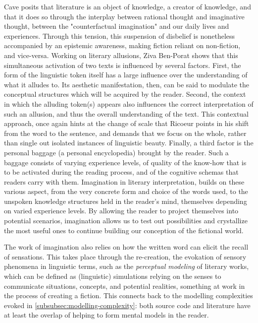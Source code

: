 Cave posits that literature is an object of knowledge, a creator of knowledge, and that it does so through the interplay between rational thought and imaginative thought, between the "counterfactual imagination" and our daily lives and experiences. Through this tension, this suspension of disbelief is nonetheless accompanied by an epistemic awareness, making fiction reliant on non-fiction, and vice-versa. Working on literary allusions, Ziva Ben-Porat shows that this simultaneous activation of two texts is influenced by several factors. First, the form of the linguistic token itself has a large influence over the understanding of what it alludes to. Its aesthetic manifestation, then, can be said to modulate the conceptual structures which will be acquired by the reader. Second, the context in which the alluding token(s) appears also influences the correct interpretation of such an allusion, and thus the overall understanding of the text. This contextual approach, once again hints at the change of scale that Ricoeur points in his shift from the word to the sentence, and demands that we focus on the whole, rather than single out isolated instances of linguistic beauty. Finally, a third factor is the personal baggage (a personal encyclopedia) brought by the reader. Such a baggage consists of varying experience levels, of quality of the know-how that is to be activated during the reading process, and of the cognitive schemas that readers carry with them. Imagination in literary interpretation, builds on these various aspect, from the very concrete form and choice of the words used, to the unspoken knowledge structures held in the reader's mind, themselves depending on varied experience levels. By allowing the reader to project themselves into potential scenarios, imagination allows us to test out possibilities and crystallize the most useful ones to continue building our conception of the fictional world.

The work of imagination also relies on how the written word can elicit the recall of sensations. This takes place through the re-creation, the evokation of sensory phenomena in linguistic terms, such as the \emph{perceptual modeling} of literary works, which can be defined as (linguistic) simulations relying on the senses to communicate situations, concepts, and potential realities, something at work in the process of creating a fiction. This connects back to the modelling complexities evoked in \autoref{subsubsec:modelling-complexity}: both source code and literature have at least the overlap of helping to form mental models in the reader.

